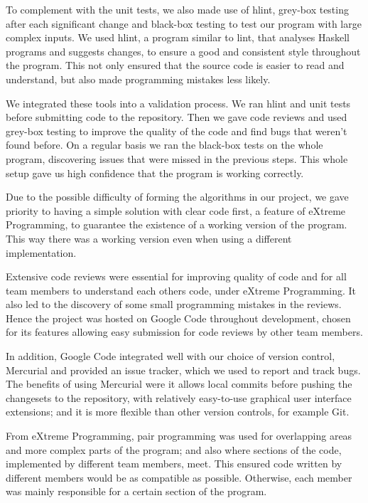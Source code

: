 To complement with the unit tests, we also made use of hlint, grey-box testing after each significant change and black-box testing to test our program with large complex inputs. We used hlint, a program similar to lint, that analyses Haskell programs and suggests changes, to ensure a good and consistent style throughout the program. This not only ensured that the source code is easier to read and understand, but also made programming mistakes less likely.

We integrated these tools into a validation process. We ran hlint and unit tests before submitting code to the repository. Then we gave code reviews and used grey-box testing to improve the quality of the code and find bugs that weren't found before. On a regular basis we ran the black-box tests on the whole program, discovering issues that were missed in the previous steps. This whole setup gave us high confidence that the program is working correctly.

Due to the possible difficulty of forming the algorithms in our project, we gave priority to having a simple solution with clear code first, a feature of eXtreme Programming, to guarantee the existence of a working version of the program. This way there was a working version even when using a different implementation.

Extensive code reviews were essential for improving quality of code and for all team members to understand each others code, under eXtreme Programming. It also led to the discovery of some small programming mistakes in the reviews. Hence the project was hosted on Google Code throughout development, chosen for its features allowing easy submission for code reviews by other team members.

In addition, Google Code integrated well with our choice of version control, Mercurial and provided an issue tracker, which we used to report and track bugs. The benefits of using Mercurial were it allows local commits before pushing the changesets to the repository, with relatively easy-to-use graphical user interface extensions; and it is more flexible than other version controls, for example Git.

From eXtreme Programming, pair programming was used for overlapping areas and more complex parts of the program; and also where sections of the code, implemented by different team members, meet. This ensured code written by different members would be as compatible as possible. Otherwise, each member was mainly responsible for a certain section of the program.

